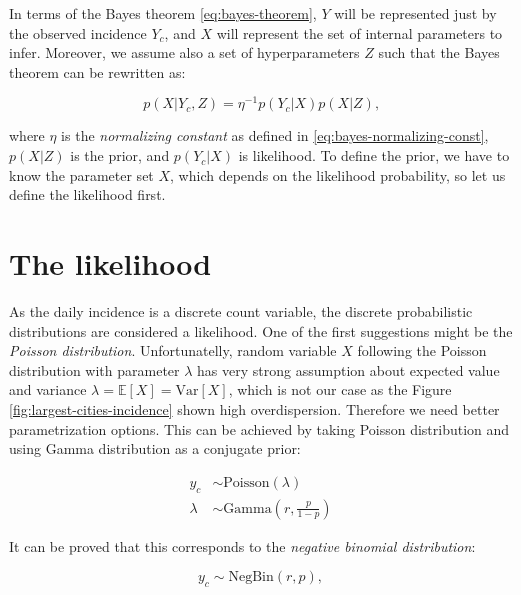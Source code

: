 \documentclass[
  digital, %
  oneside, %
  lof,     %
  lot,     %
]{fithesis4}
\begin{document}
In terms of the Bayes theorem \eqref{eq:bayes-theorem}, $Y$ will be represented just by the observed incidence $Y_c$, and $X$ will represent the set of internal parameters to infer.
Moreover, we assume also a set of hyperparameters $Z$ such that the Bayes theorem can be rewritten as:

\begin{equation}\label{eq:bayes-theorem-customized}
  p( X | Y_c, Z ) = \eta^{-1} p( Y_c | X ) p(X | Z) \text{,}
\end{equation}

\noindent
where $\eta$ is the \textit{normalizing constant} as defined in \eqref{eq:bayes-normalizing-const}, $p(X | Z)$ is the prior, and $p( Y_c | X )$ is likelihood.
To define the prior, we have to know the parameter set $X$, which depends on the likelihood probability, so let us define the likelihood first.


\section{The likelihood}

As the daily incidence is a discrete count variable, the discrete probabilistic distributions are considered a likelihood. One of the first suggestions might be the \textit{Poisson distribution}.
Unfortunatelly, random variable $X$ following the Poisson distribution with parameter $\lambda$ has very strong assumption about expected value and variance $\lambda = \mathbb{E}\left[ X \right] = \text{Var} \left[ X \right]$, which is not our case as the Figure \ref{fig:largest-cities-incidence} shown high overdispersion.
Therefore we need better parametrization options.
This can be achieved by taking Poisson distribution and using Gamma distribution as a conjugate prior:

\begin{equation}\label{eq:poisson-gamma-conjugate}
  \begin{split}
    y_c & \sim \text{Poisson}(\lambda) \\
    \lambda & \sim \text{Gamma}(r, \frac{p}{1 - p})
  \end{split}
\end{equation}

It can be proved \cite{barry2020} that this corresponds to the \textit{negative binomial distribution}:

\begin{equation}\label{eq:neg-bin-distribution}
  y_c \sim \text{NegBin}\left( r, p \right),
\end{equation}
\end{document}
